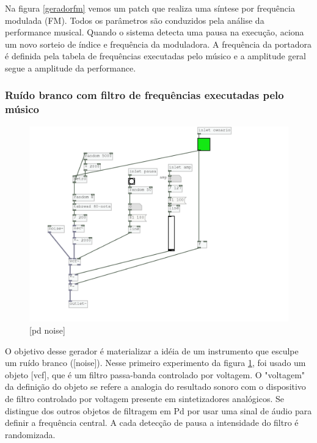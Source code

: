 \documentclass{ppgmus}
\begin{document}
Na figura \ref{geradorfm} vemos um patch que realiza 
uma síntese por frequência modulada (FM). Todos os parâmetros
são conduzidos pela análise da performance musical.
Quando o sistema detecta uma pausa na execução, aciona um novo
sorteio de índice e frequência da moduladora.
A frequência da portadora é definida pela tabela de frequências
executadas pelo músico e a amplitude geral segue a amplitude
da performance.


\subsubsection{Ruído branco com filtro de frequências executadas pelo músico}

\begin{figure}
\includegraphics[scale=.6]{gerador-sintese-noise}
\caption{[pd noise]}
\label{geradornoise}
\end{figure}

O objetivo desse gerador é materializar a idéia de um
instrumento que esculpe um ruído branco ([noise\texttildelow]).
Nesse primeiro experimento da figura \ref{geradornoise}, foi usado 
um objeto [vcf\texttildelow], que é um filtro passa-banda controlado
por voltagem. O "voltagem" da definição do objeto se refere a analogia
do resultado sonoro com  o dispositivo de filtro controlado por voltagem
presente em sintetizadores analógicos. Se distingue dos outros objetos
de filtragem em Pd por usar uma sinal de áudio para definir a frequência
central. A cada detecção de pausa a intensidade do filtro é randomizada.
\end{document}
